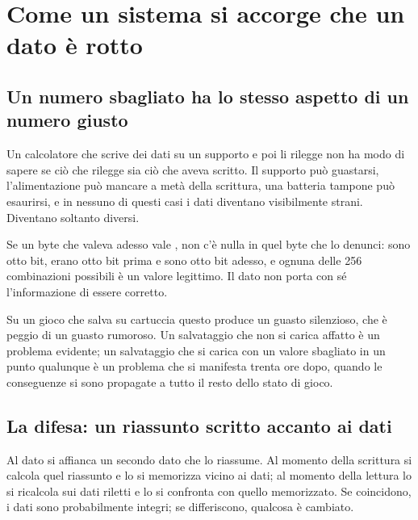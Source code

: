 
\chapter{Come un sistema si accorge che un dato è rotto}
\label{cap:integrita}

\section{Un numero sbagliato ha lo stesso aspetto di un numero giusto}

Un calcolatore che scrive dei dati su un supporto e poi li rilegge non ha modo di sapere
se ciò che rilegge sia ciò che aveva scritto. Il supporto può guastarsi, l'alimentazione
può mancare a metà della scrittura, una batteria tampone può esaurirsi, e in nessuno di
questi casi i dati diventano visibilmente strani. Diventano soltanto diversi.

Se un byte che valeva  adesso vale , non c'è nulla in quel byte che lo
denunci: sono otto bit, erano otto bit prima e sono otto bit adesso, e ognuna delle 256
combinazioni possibili è un valore legittimo. Il dato non porta con sé l'informazione di
essere corretto.

Su un gioco che salva su cartuccia questo produce un guasto silenzioso, che è peggio di
un guasto rumoroso. Un salvataggio che non si carica affatto è un problema evidente; un
salvataggio che si carica con un valore sbagliato in un punto qualunque è un problema che
si manifesta trenta ore dopo, quando le conseguenze si sono propagate a tutto il resto
dello stato di gioco.

\section{La difesa: un riassunto scritto accanto ai dati}

Al dato si affianca un secondo dato che lo riassume. Al momento della scrittura si calcola
quel riassunto e lo si memorizza vicino ai dati; al momento della lettura lo si ricalcola
sui dati riletti e lo si confronta con quello memorizzato. Se coincidono, i dati sono
probabilmente integri; se differiscono, qualcosa è cambiato.

